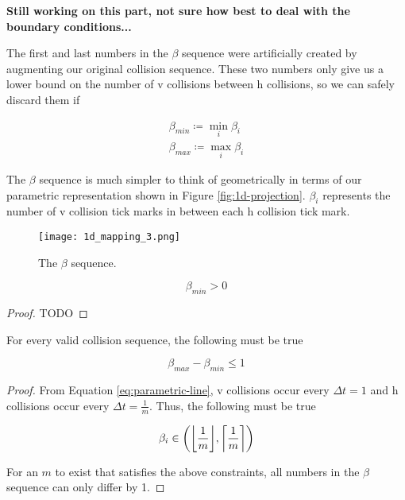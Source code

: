 \textbf{Still working on this part, not sure how best to deal with the boundary conditions...}

The first and last numbers in the $\beta$ sequence were artificially created by augmenting our original collision sequence. These two numbers only give us a lower bound on the number of v collisions between h collisions, so we can safely discard them if 

\begin{definition}
	\begin{align*}
		\beta_{min} \coloneqq \min_i \beta_i\\
		\beta_{max} \coloneqq \max_i \beta_i
	\end{align*}
\end{definition}

The $\beta$ sequence is much simpler to think of geometrically in terms of our parametric representation shown in Figure \ref{fig:1d-projection}. $\beta_i$ represents the number of v collision tick marks in between each h collision tick mark.

\begin{figure}[H]
  \begin{center}
    \texttt{[image: 1d\_mapping\_3.png]}
  \end{center}
  \vspace{-.2in} %
  \caption{\label{fig:beta-sequence} The $\beta$ sequence.}
\end{figure}

\begin{lemma}
	\[
		\beta_{min} > 0
	\]
\end{lemma}

\begin{proof}
	TODO
\end{proof}

\begin{theorem}
	For every valid collision sequence, the following must be true
	
	\[
		\beta_{max} - \beta_{min} \le 1
	\]
\end{theorem}

\begin{proof}

From Equation \ref{eq:parametric-line}, v collisions occur every $\Delta t = 1$ and h collisions occur every $\Delta t = \frac{1}{m}$. Thus, the following must be true

\[
	\beta_i \in \paren{\floor{\frac{1}{m}}, \ceil{\frac{1}{m}}}
\]

For an $m$ to exist that satisfies the above constraints, all numbers in the $\beta$ sequence can only differ by 1.

\end{proof}

